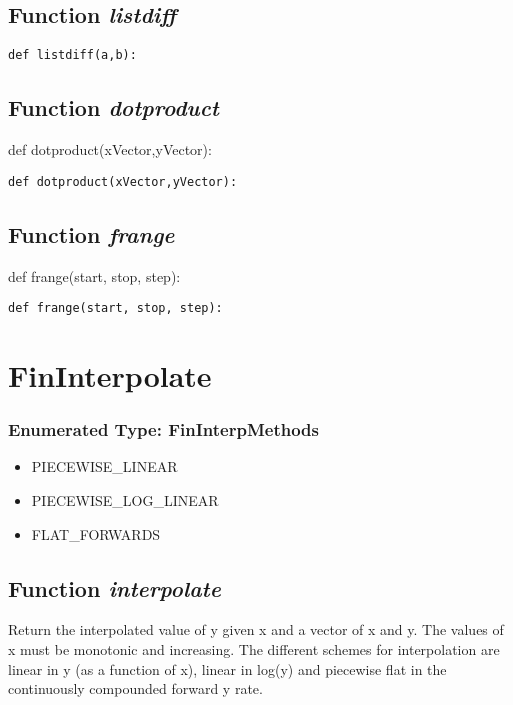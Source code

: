 \documentclass[twoside,11pt]{book}
\begin{document}
\subsection{Function {\it listdiff}}


\begin{lstlisting}
def listdiff(a,b):
\end{lstlisting}

\subsection{Function {\it dotproduct}}
def dotproduct(xVector,yVector):

\begin{lstlisting}
def dotproduct(xVector,yVector):
\end{lstlisting}

\subsection{Function {\it frange}}
def frange(start, stop, step):

\begin{lstlisting}
def frange(start, stop, step):
\end{lstlisting}

\newpage
\section{FinInterpolate}

\subsubsection{Enumerated Type: FinInterpMethods}
\begin{itemize}
\item{PIECEWISE\_LINEAR}
\item{PIECEWISE\_LOG\_LINEAR}
\item{FLAT\_FORWARDS}
\end{itemize}

\subsection{Function {\it interpolate}}
Return the interpolated value of y given x and a vector of x and y. The values of x must be monotonic and increasing. The different schemes for interpolation are linear in y (as a function of x), linear in log(y) and piecewise flat in the continuously compounded forward y rate. 
\end{document}

